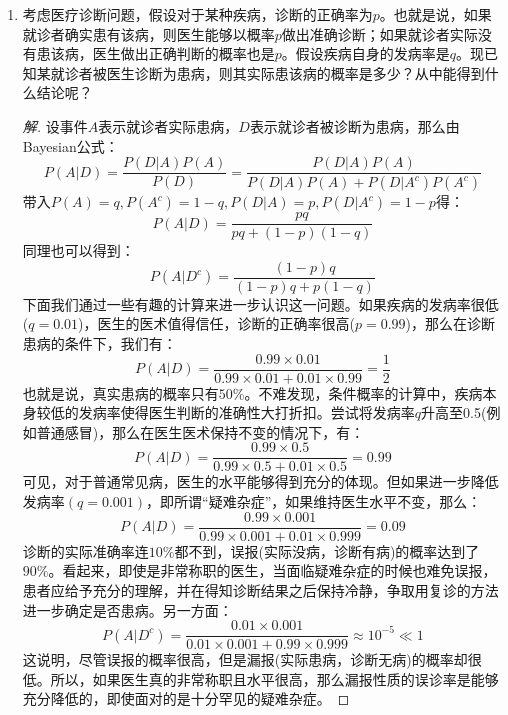 \documentclass[12pt]{article}
\newcommand{\hei}{\CJKfamily{hei}}                          %
\begin{document}
\begin{enumerate}
\item {\hei 考虑医疗诊断问题，假设对于某种疾病，诊断的正确率为$p$。也就是说，如果就诊者确实患有该病，则医生能够以概率$p$做出准确诊断；如果就诊者实际没有患该病，医生做出正确判断的概率也是$p$。假设疾病自身的发病率是$q$。现已知某就诊者被医生诊断为患病，则其实际患该病的概率是多少？从中能得到什么结论呢？}
\begin{proof}[解]
	设事件$A$表示就诊者实际患病，$D$表示就诊者被诊断为患病，那么由Bayesian公式：
	\begin{equation}
	P(A|D)=\frac{P(D|A)P(A)}{P(D)}=\frac{P(D|A)P(A)}{P(D|A)P(A)+P(D|A^c)P(A^c)}
	\end{equation}
	带入$P(A)=q,P(A^c)=1-q,P(D|A)=p,P(D|A^c)=1-p$得：
	\begin{equation}
	P(A|D)=\frac{pq}{pq+(1-p)(1-q)}
	\end{equation}
	同理也可以得到：
	\begin{equation}
	P(A|D^c)=\frac{(1-p)q}{(1-p)q+p(1-q)}
	\end{equation}
	下面我们通过一些有趣的计算来进一步认识这一问题。如果疾病的发病率很低($q=0.01$)，医生的医术值得信任，诊断的正确率很高($p=0.99$)，那么在诊断患病的条件下，我们有：
	\begin{equation}
	P(A|D)=\frac{0.99\times 0.01}{0.99\times 0.01+0.01\times 0.99}=\frac{1}{2}
	\end{equation}
	也就是说，真实患病的概率只有$50\%$。不难发现，条件概率的计算中，疾病本身较低的发病率使得医生判断的准确性大打折扣。尝试将发病率$q$升高至0.5(例如普通感冒)，那么在医生医术保持不变的情况下，有：
	\begin{equation}
	P(A|D)=\frac{0.99\times 0.5}{0.99\times 0.5+0.01\times 0.5}=0.99
	\end{equation}
	可见，对于普通常见病，医生的水平能够得到充分的体现。但如果进一步降低发病率$(q=0.001)$，即所谓“疑难杂症”，如果维持医生水平不变，那么：
	\begin{equation}
	P(A|D)=\frac{0.99\times 0.001}{0.99\times 0.001+0.01\times 0.999}=0.09
	\end{equation}
	诊断的实际准确率连$10\%$都不到，误报(实际没病，诊断有病)的概率达到了$90\%$。看起来，即使是非常称职的医生，当面临疑难杂症的时候也难免误报，患者应给予充分的理解，并在得知诊断结果之后保持冷静，争取用复诊的方法进一步确定是否患病。另一方面：
	\begin{equation}
	P(A|D^c)=\frac{0.01\times 0.001}{0.01\times 0.001+0.99\times 0.999}\approx10^{-5}\ll 1
	\end{equation}
	这说明，尽管误报的概率很高，但是漏报(实际患病，诊断无病)的概率却很低。所以，如果医生真的非常称职且水平很高，那么漏报性质的误诊率是能够充分降低的，即使面对的是十分罕见的疑难杂症。
\end{proof}



\end{enumerate}
\end{document}
